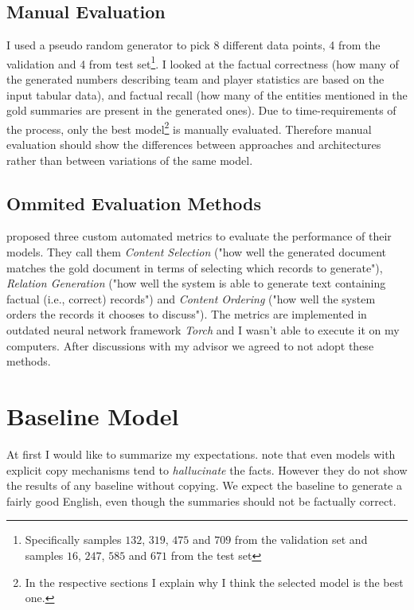 \subsection{Manual Evaluation}

I used a pseudo random generator to pick 8 different data points, 4 from the validation and 4 from test set\footnote{Specifically samples $132$, $319$, $475$ and $709$ from the validation set and samples $16$, $247$, $585$ and $671$ from the test set}. I looked at the factual correctness (how many of the generated numbers describing team and player statistics are based on the input tabular data), and factual recall (how many of the entities mentioned in the gold summaries are present in the generated ones). Due to time-requirements of the process, only the best model\footnote{In the respective sections I explain why I think the selected model is the best one.} is manually evaluated. Therefore manual evaluation should show the differences between approaches and architectures rather than between variations of the same model.

\subsection{Ommited Evaluation Methods}

\citep{wiseman2017} proposed three custom automated metrics to evaluate the performance of their models. They call them \emph{Content Selection} ("how well the generated document matches the gold document in terms of selecting which records to generate"), \emph{Relation Generation} ("how well the system is able to generate text containing factual (i.e., correct) records") and \emph{Content Ordering} ("how well the system orders the records it chooses to discuss"). The metrics are implemented in outdated neural network framework \emph{Torch} and I wasn't able to execute it on my computers. After discussions with my advisor we agreed to not adopt these methods.

\section{Baseline Model}

At first I would like to summarize my expectations. \citep{wiseman2017} note that even models with explicit copy mechanisms tend to \emph{hallucinate} the facts. However they do not show the results of any baseline without copying. We expect the baseline to generate a fairly good English, even though the summaries should not be factually correct.

